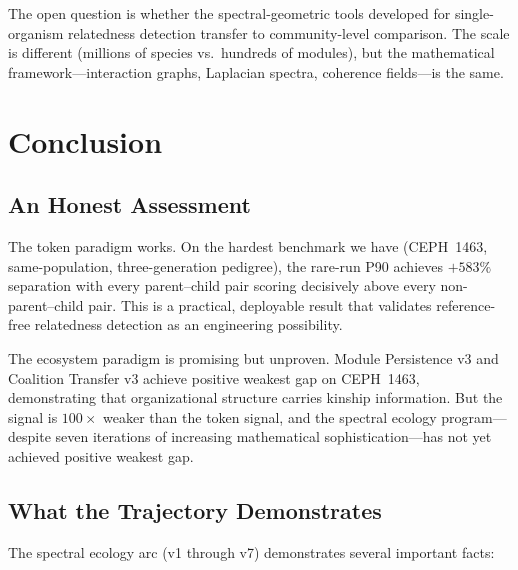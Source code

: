 \documentclass{../yalumba}
\begin{document}
The open question is whether the spectral-geometric tools developed
for single-organism relatedness detection transfer to community-level
comparison.  The scale is different (millions of species vs.\ hundreds
of modules), but the mathematical framework---interaction graphs,
Laplacian spectra, coherence fields---is the same.


\section{Conclusion}
\label{sec:conclusion}

\subsection{An Honest Assessment}

The token paradigm works.  On the hardest benchmark we have (CEPH~1463,
same-population, three-generation pedigree), the rare-run P90 achieves
$+583\%$ separation with every parent--child pair scoring decisively
above every non-parent--child pair.  This is a practical, deployable
result that validates reference-free relatedness detection as an
engineering possibility.

The ecosystem paradigm is promising but unproven.  Module Persistence v3
and Coalition Transfer v3 achieve positive weakest gap on CEPH~1463,
demonstrating that organizational structure carries kinship information.
But the signal is $100\times$ weaker than the token signal, and the
spectral ecology program---despite seven iterations of increasing
mathematical sophistication---has not yet achieved positive weakest gap.

\subsection{What the Trajectory Demonstrates}

The spectral ecology arc (v1 through v7) demonstrates several important
facts:
\end{document}
